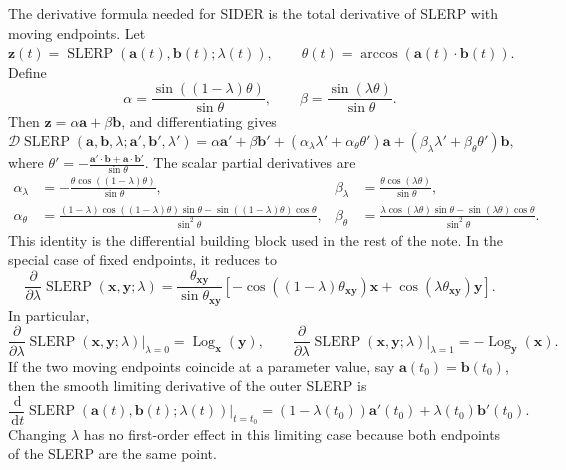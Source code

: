 \documentclass[a4paper,11pt]{article}
\newcommand{\bx}{\mathbf{x}}
\newcommand{\by}{\mathbf{y}}
\newcommand{\bz}{\mathbf{z}}
\newcommand{\ba}{\mathbf{a}}
\newcommand{\bb}{\mathbf{b}}
\newcommand{\Log}{\operatorname{Log}}
\numberwithin{equation}{section}
\theoremstyle{plain}
\theoremstyle{definition}
\theoremstyle{remark}
\newcommand{\slerp}{\operatorname{SLERP}}
\newcommand{\dd}{\,\mathrm{d}}
\begin{document}
The derivative formula needed for SIDER is the total derivative of SLERP with moving endpoints.  Let
\(\bz(t)=\slerp(\ba(t),\bb(t);\lambda(t)), \qquad \theta(t)=\arccos(\ba(t)\cdot\bb(t)).\)
Define
\[
        \alpha=\frac{\sin((1-\lambda)\theta)}{\sin\theta},
        \qquad
        \beta=\frac{\sin(\lambda\theta)}{\sin\theta}.
\]
Then $\bz=\alpha\ba+\beta\bb$, and differentiating gives
\begin{equation}
\label{eq:slerp-total-derivative}
\boxed{
        \mathcal{D}\slerp(\ba,\bb,\lambda;\ba',\bb',\lambda')
        =
        \alpha\ba'
        +
        \beta\bb'
        +
        (\alpha_\lambda\lambda'+\alpha_\theta\theta')\ba
        +
        (\beta_\lambda\lambda'+\beta_\theta\theta')\bb ,
}
\end{equation}
where
\(\theta' = -\frac{\ba'\cdot\bb+\ba\cdot\bb'}{\sin\theta}.\)
The scalar partial derivatives are
\[
\begin{aligned}
        \alpha_\lambda
        &=
        -\frac{\theta\cos((1-\lambda)\theta)}{\sin\theta},
        &
        \beta_\lambda
        &=
        \frac{\theta\cos(\lambda\theta)}{\sin\theta},
        \\
        \alpha_\theta
        &=
        \frac{(1-\lambda)\cos((1-\lambda)\theta)\sin\theta
        -\sin((1-\lambda)\theta)\cos\theta}{\sin^2\theta},
        &
        \beta_\theta
        &=
        \frac{\lambda\cos(\lambda\theta)\sin\theta
        -\sin(\lambda\theta)\cos\theta}{\sin^2\theta}.
\end{aligned}
\]
This identity is the differential building block used in the rest of the note.  In the special case of fixed endpoints, it reduces to
\[
        \frac{\partial}{\partial \lambda}\slerp(\bx,\by;\lambda)
        =
        \frac{\theta_{\bx\by}}{\sin\theta_{\bx\by}}
        \left[
        -\cos((1-\lambda)\theta_{\bx\by})\bx
        +
        \cos(\lambda\theta_{\bx\by})\by
        \right].
\]
In particular,
\[
        \frac{\partial}{\partial \lambda}\slerp(\bx,\by;\lambda)\bigg|_{\lambda=0}
        =
        \Log_{\bx}(\by),
        \qquad
        \frac{\partial}{\partial \lambda}\slerp(\bx,\by;\lambda)\bigg|_{\lambda=1}
        =
        -\Log_{\by}(\bx).
\]
If the two moving endpoints coincide at a parameter value, say $\ba(t_0)=\bb(t_0)$, then the smooth limiting derivative of the outer SLERP is
\[
        \frac{\dd}{\dd t}\slerp(\ba(t),\bb(t);\lambda(t))\bigg|_{t=t_0}
        =
        (1-\lambda(t_0))\ba'(t_0)+\lambda(t_0)\bb'(t_0).
\]
Changing $\lambda$ has no first-order effect in this limiting case because both endpoints of the SLERP are the same point.
\end{document}
